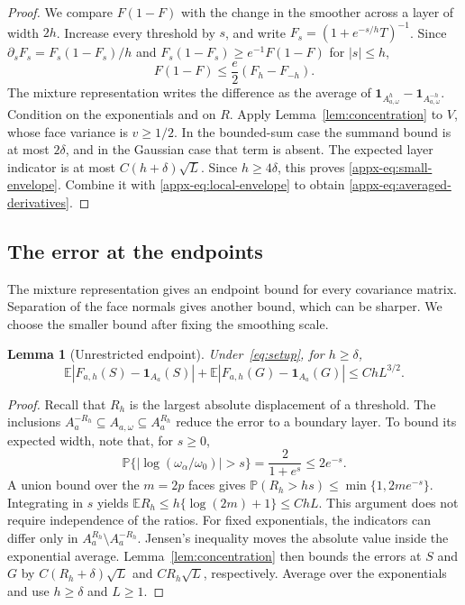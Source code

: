 \documentclass[11pt,letterpaper]{article}
\newtheorem{lemma}{Lemma}
\theoremstyle{remark}
\newcommand{\E}{\mathbb E}
\newcommand{\Pp}{\mathbb P}
\newcommand{\ind}{\mathbf 1}
\begin{document}
\begin{proof}
We compare \(F(1-F)\) with the change in the smoother across a layer
of width \(2h\). Increase every threshold by \(s\), and write
\(F_s=(1+e^{-s/h}T)^{-1}\). Since
\(\partial_sF_s=F_s(1-F_s)/h\) and
\(F_s(1-F_s)\ge e^{-1}F(1-F)\) for \(|s|\le h\),
\[
 F(1-F)\le\frac e2(F_h-F_{-h}).
\]
The mixture representation writes the difference as the average of
\(\ind_{A_{a,\omega}^h}-\ind_{A_{a,\omega}^{-h}}\).
Condition on the exponentials and on \(R\). Apply
Lemma~\ref{lem:concentration} to \(V\), whose face variance is
\(v\ge1/2\). In the bounded-sum case the summand bound is at most
\(2\delta\), and in the Gaussian case that term is absent. The expected
layer indicator is at most \(C(h+\delta)\sqrt L\). Since \(h\ge4\delta\), this proves
\eqref{appx-eq:small-envelope}. Combine it with
\eqref{appx-eq:local-envelope} to obtain
\eqref{appx-eq:averaged-derivatives}.
\end{proof}



\subsection{The error at the endpoints}

The mixture representation gives an endpoint bound for every
covariance matrix. Separation of the face normals gives another
bound, which can be sharper. We choose the smaller bound after fixing
the smoothing scale.

\begin{lemma}[Unrestricted endpoint]\label{appx-lem:endpoint-free}
Under~\eqref{eq:setup}, for \(h\ge\delta\),
\begin{equation}
 \E|F_{a,h}(S)-\ind_{A_a}(S)|
 +\E|F_{a,h}(G)-\ind_{A_a}(G)|\le ChL^{3/2}.
 \label{appx-eq:endpoint-free}
\end{equation}
\end{lemma}

\begin{proof}
Recall that \(R_h\) is the largest absolute displacement of a threshold.
The inclusions \(A_a^{-R_h}\subseteq A_{a,\omega}\subseteq A_a^{R_h}\)
reduce the error to a boundary layer. To bound its expected width,
note that, for \(s\ge0\),
\[
 \Pp\{|\log(\omega_\alpha/\omega_0)|>s\}
 =\frac2{1+e^s}\le2e^{-s}.
\]
A union bound over the \(m=2p\) faces gives
\(\Pp(R_h>hs)\le\min\{1,2me^{-s}\}\). Integrating in \(s\)
yields \(\E R_h\le h\{\log(2m)+1\}\le ChL\). This argument
does not require independence of the ratios.
For fixed exponentials, the indicators can differ only in
\(A_a^{R_h}\setminus A_a^{-R_h}\). Jensen's inequality moves
the absolute value inside the exponential average.
Lemma~\ref{lem:concentration} then bounds the errors at \(S\)
and \(G\) by \(C(R_h+\delta)\sqrt L\) and \(CR_h\sqrt L\),
respectively. Average over the exponentials and use \(h\ge\delta\)
and \(L\ge1\).
\end{proof}
\end{document}
